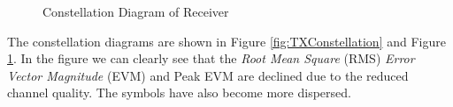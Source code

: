 \documentclass[10pt]{article}
\numberwithin{figure}{section}
\numberwithin{equation}{section}
\begin{document}
\begin{figure}[!h]
    \centering
    \caption{Constellation Diagram of Receiver}
    \label{fig:RXConstellation}
\end{figure}
The constellation diagrams are shown in Figure \ref{fig:TXConstellation} and Figure \ref{fig:RXConstellation}. In the figure we can clearly see that the \textit{Root Mean Square} (RMS) \textit{Error Vector Magnitude} (EVM) and Peak EVM are declined due to the reduced channel quality. The symbols have also become more dispersed.
\end{document}
